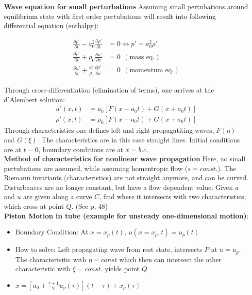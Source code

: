 \documentclass[8pt, landscape, fleqn]{scrartcl}
\begin{document}
\begin{multicols*}{3}
\textbf{Wave equation for small perturbations}
Assuming small pertubations around equilibrium state with first order pertubations will result into following differential equation (enthalpy):

\begin{align*}
    \frac{\partial p'}{\partial t} - a_0^2 \frac{\partial \rho'}{\partial t} &= 0 \Longleftrightarrow p' = a_0^2 \rho' \\
    \frac{\partial \rho'}{\partial t} + \rho_0 \frac{\partial u'}{\partial x} &= 0 ~~ (\text{mass eq.}) \\
    \frac{\partial u'}{\partial t} + \frac{a_0^2}{\rho_0} \frac{\partial \rho'}{\partial x} &= 0 ~~ (\text{momentum eq.})
\end{align*}

Through cross-differentiation (elimination of terms), one arrives at the d'Alembert solution:
\begin{align*}
    u'(x,t) &= a_0 [F(x-a_0t) + G(x+a_0t)] \\
    \rho'(x,t) &= \rho_0 [F(x-a_0t) + G(x+a_0t)]
\end{align*}
Through characteristics one defines left and right propagatiting waves, $F(\eta)$ and $G(\xi)$. The characteristics are in this case straight lines. Initial conditions are at $t=0$, boundary conditions are at $x=b.c.$ \\

\textbf{Method of characteristics for nonlinear wave propagation}
Here, no small pertubations are assumed, while assuming homentropic flow ($s=const.$). The Riemann invariants (characteristics) are not straight anymore, and can be curved. Disturbances are no longer constant, but have a flow dependent value. Given $a$ and $u$ are given along a curve $C$, find where it intersects with two characteristics, which cross at point $Q$. (See p. 48) \\ 

\textbf{Piston Motion in tube (example for unsteady one-dimensional motion)}:

\begin{itemize}
    \item Boundary Condition: At $x = x_p(t)$, $u(x=x_p,t) = u_p(t)$
    \item How to solve: Left propagating wave from rest state, intersects $P$ at $u=u_p$. The characterisitic with $\eta = const$ which then can intersect the other characteristic with $\xi = const. $ yields point $Q$
    \item $x = \left[ a_0 + \frac{\gamma + 1}{2} u_p(\tau)\right](t-\tau) + x_p(\tau)$
\end{itemize}


\end{multicols*}
\end{document}

